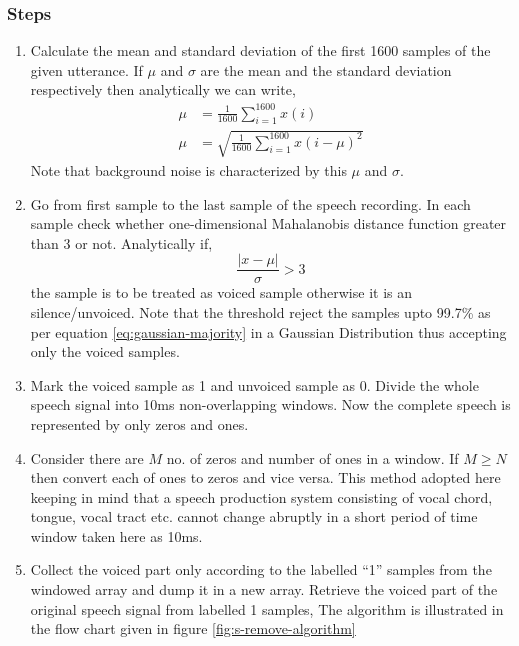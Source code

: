 \documentclass[12pt, a4paper, twoside]{report}
\begin{document}
\subsubsection{Steps}
\begin{enumerate}
\item Calculate the mean and standard deviation of the first 1600 samples of the given utterance. If $\mu$ and $\sigma$ are the mean and the standard deviation respectively then analytically we can write,
\begin{align}
\mu &= \frac{1}{1600} \sum_{i=1}^{1600} x(i) \\
\mu &= \sqrt{\frac{1}{1600} \sum_{i=1}^{1600} x(i - \mu)^2}
\end{align}
Note that background noise is characterized by this $\mu$ and $\sigma$.
\item Go from first sample to the last sample of the speech recording. In each sample check whether one-dimensional Mahalanobis distance function greater than 3 or not. Analytically if,
\begin{equation}
\frac{|x - \mu |}{\sigma} > 3
\end{equation}
the sample is to be treated as voiced sample otherwise it is an silence/unvoiced. Note that the threshold reject the samples upto 99.7\% as per equation \ref{eq:gaussian-majority} in a Gaussian Distribution thus accepting only the voiced samples.

\item Mark the voiced sample as 1 and unvoiced sample as 0. Divide the whole speech signal into 10ms non-overlapping windows. Now the complete speech is represented by only zeros and ones.

\item Consider there are $M$ no. of zeros and number of ones in a window. If $M \geq N$ then convert each of ones to zeros and vice versa. This method adopted here keeping in mind that a speech production system consisting of vocal chord, tongue, vocal tract etc. cannot change abruptly in a short period of time window taken here as 10ms.

\item Collect the voiced part only according to the labelled ``1'' samples from the windowed array and dump it in a new array. Retrieve the voiced part of the original speech signal from labelled 1 samples, The algorithm is illustrated in the flow chart given in figure \ref{fig:s-remove-algorithm}

\end{enumerate}
\end{document}
